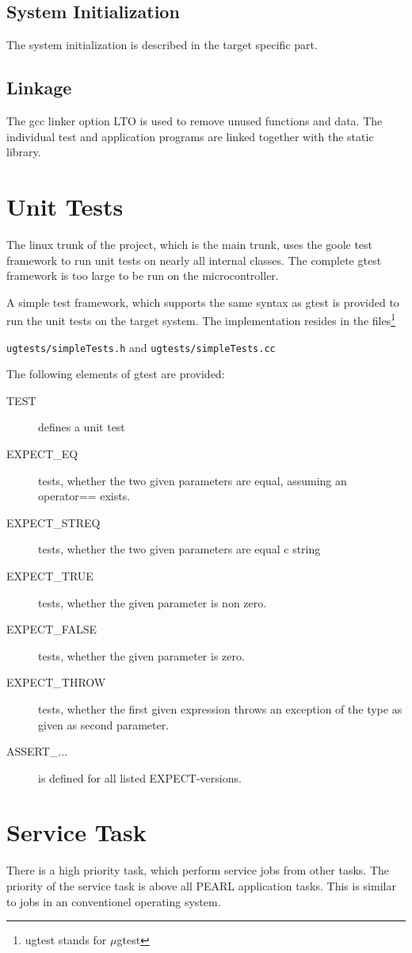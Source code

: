 \subsection{System Initialization}
The system initialization is described in the target specific part.

\subsection{Linkage}
The gcc linker option LTO is used to remove unused functions and data. 
The individual test and application programs are linked together with 
the static library.

\section{Unit Tests}
The linux trunk of the project, which is the main trunk, uses the
goole test framework to run unit tests on nearly all internal classes.
The complete gtest framework is too large to be run on the microcontroller.

A simple test framework, which supports the same syntax as gtest is provided
to run the unit tests on the target system.
The implementation resides in the files\footnote{ugtest stands for $\mu$gtest}

 \verb|ugtests/simpleTests.h| and 
 \verb|ugtests/simpleTests.cc| 

The following elements of gtest are provided:
\begin{description}
\item[TEST] defines a unit test
\item[EXPECT\_EQ] tests, whether the two given parameters are equal, 
   assuming an operator== exists.
\item[EXPECT\_STREQ] tests, whether the two given parameters are equal c string 
\item[EXPECT\_TRUE] tests, whether the  given parameter is non zero. 
\item[EXPECT\_FALSE] tests, whether the  given parameter is zero. 
\item[EXPECT\_THROW] tests, whether the first given expression throws
   an exception of the type as given as  second parameter.
\item[ASSERT\_...] is defined for all listed EXPECT-versions. 
\end{description}

\section{Service Task}
There is a high priority task, which perform service jobs from 
other tasks.
The priority of the service task is above all PEARL application
tasks.
This is similar to jobs in an conventionel operating
system. 


